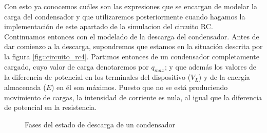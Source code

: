 \documentclass[../main.tex]{subfiles}
\begin{document}
    
Con esto ya conocemos cuáles son las expresiones que se encargan de modelar la carga del condensador y que utilizaremos posteriormente cuando hagamos la implementación de este apartado de la simulacion del circuito RC. \\


Continuamos entonces con el modelado de la descarga del condensador. Antes de dar comienzo a la descarga, supondremos que estamos en la situación descrita por la figura \ref{fig::circuito_rc4}. Partimos entonces de un condensador completamente cargado, cuyo valor de carga denotaremos por $q_{max}$; y que además los valores de la diferencia de potencial en los terminales del dispositivo ($V_L$) y de la energía almacenada ($E$) en él son máximos. Puesto que no se está produciendo movimiento de cargas, la intensidad de corriente es nula, al igual que la diferencia de potencial en la resistencia. \\

\begin{figure}[!h]
    \centering
    \caption{Fases del estado de descarga de un condensador}
    \label{fig::descarga_condensador}
\end{figure}
\end{document}
